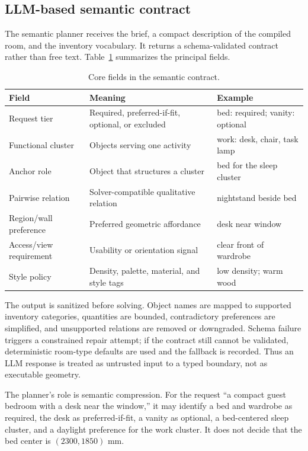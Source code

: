 \documentclass[pdflatex,sn-mathphys-num]{sn-jnl}
\begin{document}
\subsection{LLM-based semantic contract}

The semantic planner receives the brief, a compact description of the compiled room, and the inventory vocabulary. It returns a schema-validated contract rather than free text. Table~\ref{tab:semantic-contract} summarizes the principal fields.

\begin{table}[!t]
  \caption{Core fields in the semantic contract.}\label{tab:semantic-contract}
  \centering
  \small
  \begin{tabularx}{\textwidth}{@{}p{}X X@{}}
    \toprule
    Field & Meaning & Example \\
    \midrule
    Request tier & Required, preferred-if-fit, optional, or excluded & bed: required; vanity: optional \\
    Functional cluster & Objects serving one activity & work: desk, chair, task lamp \\
    Anchor role & Object that structures a cluster & bed for the sleep cluster \\
    Pairwise relation & Solver-compatible qualitative relation & nightstand beside bed \\
    Region/wall preference & Preferred geometric affordance & desk near window \\
    Access/view requirement & Usability or orientation signal & clear front of wardrobe \\
    Style policy & Density, palette, material, and style tags & low density; warm wood \\
    \bottomrule
  \end{tabularx}
\end{table}

The output is sanitized before solving. Object names are mapped to supported inventory categories, quantities are bounded, contradictory preferences are simplified, and unsupported relations are removed or downgraded. Schema failure triggers a constrained repair attempt; if the contract still cannot be validated, deterministic room-type defaults are used and the fallback is recorded. Thus an LLM response is treated as untrusted input to a typed boundary, not as executable geometry.

The planner's role is semantic compression. For the request ``a compact guest bedroom with a desk near the window,'' it may identify a bed and wardrobe as required, the desk as preferred-if-fit, a vanity as optional, a bed-centered sleep cluster, and a daylight preference for the work cluster. It does not decide that the bed center is \((2300,1850)\) mm.
\end{document}

